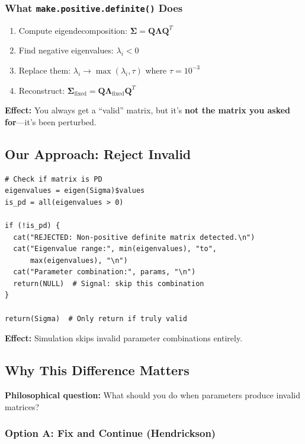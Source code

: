 \documentclass[11pt]{article}
\begin{document}
\subsubsection{What \texttt{make.positive.definite()} Does}

\begin{enumerate}
    \item Compute eigendecomposition: $\boldsymbol{\Sigma} = \mathbf{Q} \boldsymbol{\Lambda} \mathbf{Q}^T$
    \item Find negative eigenvalues: $\lambda_i < 0$
    \item Replace them: $\lambda_i \rightarrow \max(\lambda_i, \tau)$ where $\tau = 10^{-3}$
    \item Reconstruct: $\boldsymbol{\Sigma}_{\text{fixed}} = \mathbf{Q} \boldsymbol{\Lambda}_{\text{fixed}} \mathbf{Q}^T$
\end{enumerate}

\textbf{Effect:} You always get a ``valid'' matrix, but it's \textbf{not the matrix you asked for}---it's been perturbed.

\subsection{Our Approach: Reject Invalid}

\begin{lstlisting}[style=Rstyle]
# Check if matrix is PD
eigenvalues = eigen(Sigma)$values
is_pd = all(eigenvalues > 0)

if (!is_pd) {
  cat("REJECTED: Non-positive definite matrix detected.\n")
  cat("Eigenvalue range:", min(eigenvalues), "to",
      max(eigenvalues), "\n")
  cat("Parameter combination:", params, "\n")
  return(NULL)  # Signal: skip this combination
}

return(Sigma)  # Only return if truly valid
\end{lstlisting}

\textbf{Effect:} Simulation skips invalid parameter combinations entirely.

\subsection{Why This Difference Matters}

\textbf{Philosophical question:} What should you do when parameters produce invalid matrices?

\subsubsection{Option A: Fix and Continue (Hendrickson)}
\end{document}
